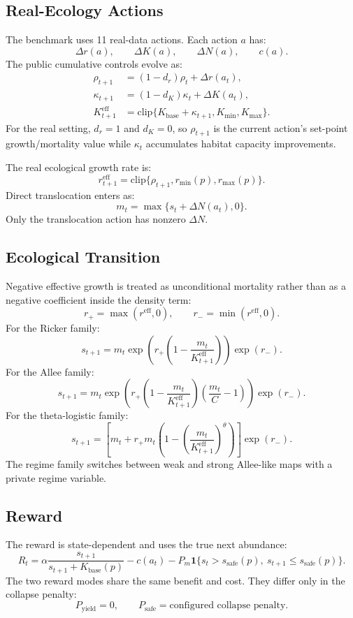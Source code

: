 \documentclass[11pt]{article}
\newcommand{\1}{\mathbf{1}}
\begin{document}
\subsection{Real-Ecology Actions}

The benchmark uses 11 real-data actions.  Each action $a$ has:
\[
  \Delta r(a),\qquad \Delta K(a),\qquad \Delta N(a),\qquad c(a).
\]
The public cumulative controls evolve as:
\begin{align}
  \rho_{t+1} &= (1-d_r)\rho_t+\Delta r(a_t),\\
  \kappa_{t+1} &= (1-d_K)\kappa_t+\Delta K(a_t),\\
  K^{\mathrm{eff}}_{t+1}
    &= \mathrm{clip}\{K_{\mathrm{base}}+\kappa_{t+1},K_{\min},K_{\max}\}.
\end{align}
For the real setting, $d_r=1$ and $d_K=0$, so $\rho_{t+1}$ is the current action's
set-point growth/mortality value while $\kappa_t$ accumulates habitat capacity
improvements.

The real ecological growth rate is:
\[
  r^{\mathrm{eff}}_{t+1}
  = \mathrm{clip}\{\rho_{t+1},r_{\min}(p),r_{\max}(p)\}.
\]
Direct translocation enters as:
\[
  m_t = \max\{s_t+\Delta N(a_t),0\}.
\]
Only the translocation action has nonzero $\Delta N$.

\subsection{Ecological Transition}

Negative effective growth is treated as unconditional mortality rather than as a
negative coefficient inside the density term:
\[
  r_+ = \max(r^{\mathrm{eff}},0),\qquad
  r_- = \min(r^{\mathrm{eff}},0).
\]
For the Ricker family:
\[
  s_{t+1}
  =
  m_t\exp\left(r_+\left(1-\frac{m_t}{K^{\mathrm{eff}}_{t+1}}\right)\right)
  \exp(r_-).
\]
For the Allee family:
\[
  s_{t+1}
  =
  m_t\exp\left(
    r_+\left(1-\frac{m_t}{K^{\mathrm{eff}}_{t+1}}\right)
       \left(\frac{m_t}{C}-1\right)
  \right)\exp(r_-).
\]
For the theta-logistic family:
\[
  s_{t+1}
  =
  \left[m_t+r_+m_t
  \left(1-\left(\frac{m_t}{K^{\mathrm{eff}}_{t+1}}\right)^\theta\right)\right]
  \exp(r_-).
\]
The regime family switches between weak and strong Allee-like maps with a
private regime variable.

\subsection{Reward}

The reward is state-dependent and uses the true next abundance:
\[
  R_t =
  \alpha\frac{s_{t+1}}{s_{t+1}+K_{\mathrm{base}}(p)}
  - c(a_t)
  - P_m\1\{s_t>s_{\mathrm{safe}}(p),\ s_{t+1}\le s_{\mathrm{safe}}(p)\}.
\]
The two reward modes share the same benefit and cost.  They differ only in the
collapse penalty:
\[
  P_{\mathrm{yield}}=0,\qquad
  P_{\mathrm{safe}}=\text{configured collapse penalty}.
\]
\end{document}
